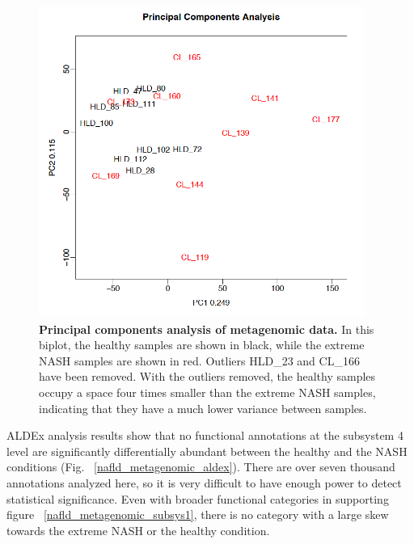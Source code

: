 \begin{figure}[h]
\begin{center}
\includegraphics[width=0.95\textwidth]{metagenomic_pca_no_outliers.png}
\caption[Principal components analysis of metagenomic data.]{\textbf{Principal components analysis of metagenomic data.} In this biplot, the healthy samples are shown in black, while the extreme NASH samples are shown in red. Outliers HLD\_23 and CL\_166 have been removed. With the outliers removed, the healthy samples occupy a space four times smaller than the extreme NASH samples, indicating that they have a much lower variance between samples.}
\label{nafld_metagenomic_pca_no_outliers}
\end{center}
\end{figure}


ALDEx analysis results show that no functional annotations at the subsystem 4 level are significantly differentially abundant between the healthy and the NASH conditions (Fig. ~\ref{nafld_metagenomic_aldex}). There are over seven thousand annotations analyzed here, so it is very difficult to have enough power to detect statistical significance. Even with broader functional categories in supporting figure ~\ref{nafld_metagenomic_subsys1}, there is no category with a large skew towards the extreme NASH or the healthy condition.

